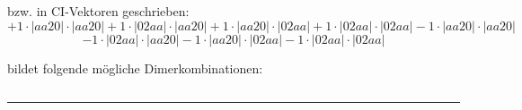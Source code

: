\documentclass{article}
\begin{document}
\begin{minipage}{\linewidth}
bzw. in CI-Vektoren geschrieben: 
 $$+ 1 \cdot \left|aa20 \right| \cdot \left| aa20 \right| 
+ 1 \cdot \left|02aa \right| \cdot \left| aa20 \right| 
+ 1 \cdot \left|aa20 \right| \cdot \left| 02aa \right| 
+ 1 \cdot \left|02aa \right| \cdot \left| 02aa \right| 
- 1 \cdot \left|aa20 \right| \cdot \left| aa20 \right| 
 $$ $$ - 1 \cdot \left|02aa \right| \cdot \left| aa20 \right| 
- 1 \cdot \left|aa20 \right| \cdot \left| 02aa \right| 
- 1 \cdot \left|02aa \right| \cdot \left| 02aa \right| 
$$



 bildet folgende mögliche Dimerkombinationen:

$$$$



\end{minipage}
\vspace{0.5cm}
\hrule
\vspace{0.5cm}
\end{document}
